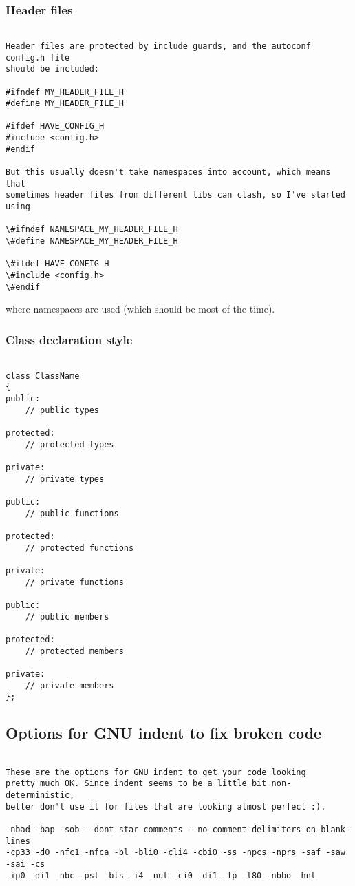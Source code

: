 \subsubsection{Header files}
\begin{verbatim}

Header files are protected by include guards, and the autoconf config.h file
should be included:

#ifndef MY_HEADER_FILE_H
#define MY_HEADER_FILE_H

#ifdef HAVE_CONFIG_H
#include <config.h>
#endif

But this usually doesn't take namespaces into account, which means that 
sometimes header files from different libs can clash, so I've started using

\#ifndef NAMESPACE_MY_HEADER_FILE_H
\#define NAMESPACE_MY_HEADER_FILE_H

\#ifdef HAVE_CONFIG_H
\#include <config.h>
\#endif

\end{verbatim}

where namespaces are used (which should be most of the time).

\subsubsection{Class declaration style}
\begin{verbatim}

class ClassName
{
public:
	// public types

protected:
	// protected types

private:
	// private types
	
public:
	// public functions

protected:
	// protected functions

private:
	// private functions

public:
	// public members

protected:
	// protected members

private:
	// private members
};

\end{verbatim}
\subsection{Options for GNU indent to fix broken code}
\begin{verbatim}

These are the options for GNU indent to get your code looking
pretty much OK. Since indent seems to be a little bit non-deterministic, 
better don't use it for files that are looking almost perfect :). 

-nbad -bap -sob --dont-star-comments --no-comment-delimiters-on-blank-lines
-cp33 -d0 -nfc1 -nfca -bl -bli0 -cli4 -cbi0 -ss -npcs -nprs -saf -saw -sai -cs
-ip0 -di1 -nbc -psl -bls -i4 -nut -ci0 -di1 -lp -l80 -nbbo -hnl

\end{verbatim}

